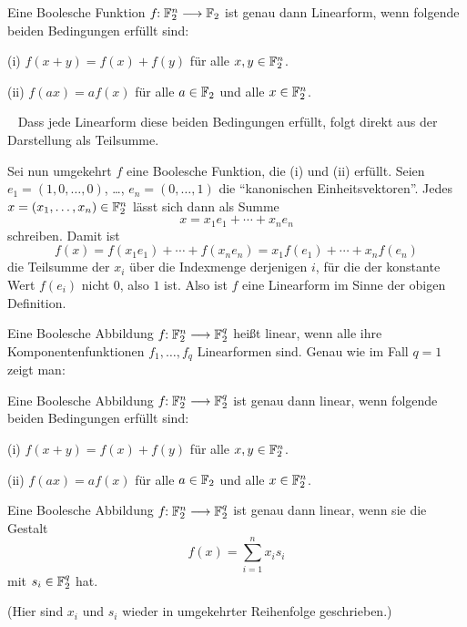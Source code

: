 \begin{refsegment}
\begin{satz}\label{thm-bool-linf}
   Eine Boolesche Funktion $f\!\!: \mathbb{F}_2^n \longrightarrow \mathbb{F}_2$
   ist genau dann Linearform, wenn folgende beiden Bedingungen
   erfüllt sind:

   {\rm (i)} $f(x+y) = f(x) + f(y)$ für alle $x, y \in \mathbb{F}_2^n$.

   {\rm (ii)} $f(ax) = af(x)$ für alle $a \in \mathbb{F}_2$ und alle $x \in \mathbb{F}_2^n$.
\end{satz}
\begin{Beweis}~
   Dass jede Linearform diese beiden Bedingungen erfüllt, folgt direkt
   aus der Darstellung als Teilsumme.

   Sei nun umgekehrt $f$ eine Boolesche Funktion, die (i) und (ii) erfüllt.
   Seien $e_1 = (1,0,\ldots,0)$, \ldots, $e_n = (0,\ldots, 1)$ die
   "`kanonischen Einheitsvektoren"'. Jedes $x = (x_1, \ldots, x_n) \in \mathbb{F}_2^n$
   lässt sich dann als Summe
\[
     x = x_1 e_1 + \cdots + x_n e_n
\]
   schreiben. Damit ist
\[
     f(x) = f(x_1 e_1) + \cdots + f(x_n e_n)
          = x_1 f(e_1) + \cdots + x_n f(e_n)
\]
   die Teilsumme der $x_i$ über die Indexmenge derjenigen $i$, für die der
   konstante Wert $f(e_i)$ nicht $0$, also $1$ ist. Also ist $f$ eine
   Linearform im Sinne der obigen Definition.
\end{Beweis}

Eine Boolesche Abbildung $f\!\!: \mathbb{F}_2^n \longrightarrow \mathbb{F}_2^q$ heißt
linear,
wenn alle ihre Komponentenfunktionen $f_1, \ldots, f_q$
Linearformen sind. Genau wie im Fall $q = 1$ zeigt man:

\begin{satz}\label{thm-bool-lina0}
   Eine Boolesche Abbildung $f\!\!: \mathbb{F}_2^n \longrightarrow \mathbb{F}_2^q$
   ist genau dann linear, wenn folgende beiden Bedingungen
   erfüllt sind:

   {\rm (i)} $f(x+y) = f(x) + f(y)$ für alle $x, y \in \mathbb{F}_2^n$.

   {\rm (ii)} $f(ax) = af(x)$ für alle $a \in \mathbb{F}_2$ und alle $x \in \mathbb{F}_2^n$.
\end{satz}

\begin{satz}\label{thm-bool-lina1}
   Eine Boolesche Abbildung $f\!\!: \mathbb{F}_2^n \longrightarrow \mathbb{F}_2^q$
   ist genau dann linear, wenn sie die Gestalt
\[
     f(x) = \sum_{i=1}^n x_i s_i
\]
   mit $s_i \in \mathbb{F}_2^q$ hat.
\end{satz}
(Hier sind $x_i$ und $s_i$ wieder in umgekehrter Reihenfolge geschrieben.)


\end{refsegment}
